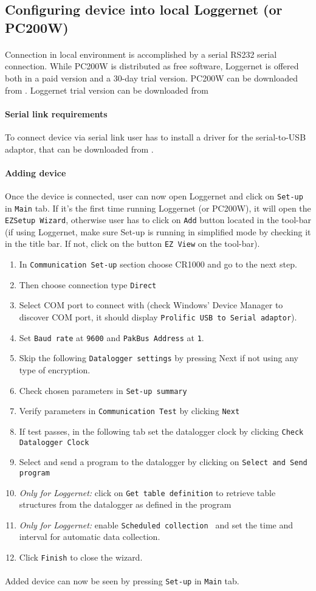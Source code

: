 \subsection{Configuring device into local Loggernet (or PC200W)}
\paragraph{}
Connection in local environment is accomplished by a serial RS232 serial connection. While PC200W is distributed as free software, Loggernet is offered both in a paid version and a 30-day trial version. PC200W can be downloaded from \cite{cs1}. Loggernet trial version can be downloaded from \cite{cs2}
\paragraph{Serial link requirements}
To connect device via serial link user has to install a driver for the serial-to-USB adaptor, that can be downloaded from \cite{prol1}. 
\paragraph{Adding device}
Once the device is connected, user can now open Loggernet and click on {\tt Set-up} in {\tt Main} tab. If it's the first time running Loggernet (or PC200W), it will open the {\tt EZSetup Wizard}, 
otherwise user has to click on {\tt Add} button located in the tool-bar (if using Loggernet, make sure Set-up is running in simplified mode by checking it in the title bar. If not, click on the button {\tt EZ View} on the tool-bar).
\begin{enumerate}
	\item In {\tt Communication Set-up} section choose CR1000 and go to the next step.
	\item Then choose connection type {\tt Direct}
	\item Select COM port to connect with (check Windows' Device Manager to discover COM port, it should display {\tt Prolific USB to Serial adaptor}).
	\item Set {\tt Baud rate} at {\tt 9600} and {\tt PakBus Address} at {\tt 1}.
	\item Skip the following {\tt Datalogger settings} by pressing Next if not using any type of encryption.
	\item Check chosen parameters in {\tt Set-up summary}
	\item Verify parameters in {\tt Communication Test} by clicking {\tt Next}
	\item If test passes, in the following tab set the datalogger clock by clicking {\tt Check Datalogger Clock}
	\item Select and send a program to the datalogger by clicking on {\tt Select and Send program}
	\item \emph{Only for Loggernet:} click on {\tt Get table definition} to retrieve table structures from the datalogger as defined in the program
	\item \emph{Only for Loggernet:} enable {\tt Scheduled collection }  and set the time  and interval for automatic data collection.
	\item Click {\tt Finish} to close the wizard.
\end{enumerate}
\paragraph{}
Added device can now be seen by pressing {\tt Set-up} in {\tt Main} tab.